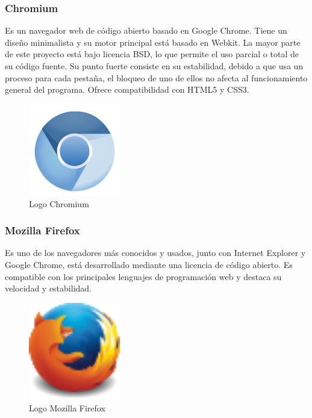 		\subsubsection{Chromium}
		Es un navegador web de código abierto basado en Google Chrome.
		Tiene un diseño minimalista y su motor principal está basado en Webkit. La mayor parte de este proyecto está bajo licencia BSD, lo que permite el uso parcial o total de su código fuente. Su punto fuerte consiste en su estabilidad, debido a que usa un proceso para cada pestaña, el bloqueo de uno de ellos no afecta al funcionamiento general del programa.
		Ofrece compatibilidad con HTML5 y CSS3.
		
		\begin{figure}[H]
		\centering
		\includegraphics[width=40mm, fbox={\fboxrule} 4mm]{images/04-metodo/39-chromium_logo.png}
		\caption{Logo Chromium}
		\label{fig:chromium-logo}
		\end{figure}
		
		\subsubsection{Mozilla Firefox}		
		Es uno de los navegadores más conocidos y usados, junto con Internet Explorer y Google Chrome, está desarrollado mediante una licencia de código abierto.
		Es compatible con los principales lenguajes de programación web y destaca su velocidad y estabilidad.

		\begin{figure}[H]
		\centering
		\includegraphics[width=40mm, fbox={\fboxrule} 4mm]{images/04-metodo/38-firefox_logo}
		\caption{Logo Mozilla Firefox}
		\label{fig:firefox-logo}
		\end{figure}
		

